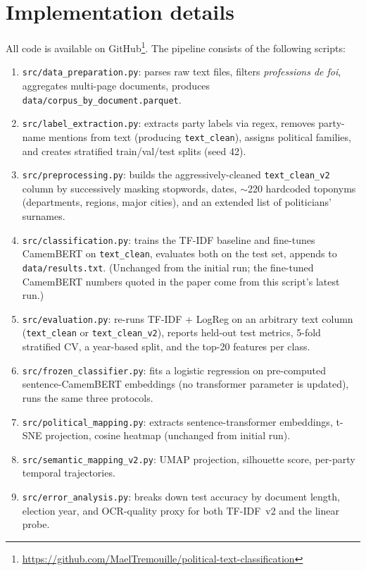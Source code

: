\documentclass{article}
\begin{document}
\appendix

\section{Implementation details}
\label{app:implementation}

All code is available on GitHub\footnote{\url{https://github.com/MaelTremouille/political-text-classification}}. The pipeline consists of the following scripts:

\begin{enumerate}
    \item \texttt{src/data\_preparation.py}: parses raw text files, filters \textit{professions de foi}, aggregates multi-page documents, produces \texttt{data/corpus\_by\_document.parquet}.
    \item \texttt{src/label\_extraction.py}: extracts party labels via regex, removes party-name mentions from text (producing \texttt{text\_clean}), assigns political families, and creates stratified train/val/test splits (seed 42).
    \item \texttt{src/preprocessing.py}: builds the aggressively-cleaned \texttt{text\_clean\_v2} column by successively masking stopwords, dates, $\sim$220 hardcoded toponyms (departments, regions, major cities), and an extended list of politicians' surnames.
    \item \texttt{src/classification.py}: trains the TF-IDF baseline and fine-tunes CamemBERT on \texttt{text\_clean}, evaluates both on the test set, appends to \texttt{data/results.txt}. (Unchanged from the initial run; the fine-tuned CamemBERT numbers quoted in the paper come from this script's latest run.)
    \item \texttt{src/evaluation.py}: re-runs TF-IDF + LogReg on an arbitrary text column (\texttt{text\_clean} or \texttt{text\_clean\_v2}), reports held-out test metrics, 5-fold stratified CV, a year-based split, and the top-20 features per class.
    \item \texttt{src/frozen\_classifier.py}: fits a logistic regression on pre-computed sentence-CamemBERT embeddings (no transformer parameter is updated), runs the same three protocols.
    \item \texttt{src/political\_mapping.py}: extracts sentence-transformer embeddings, t-SNE projection, cosine heatmap (unchanged from initial run).
    \item \texttt{src/semantic\_mapping\_v2.py}: UMAP projection, silhouette score, per-party temporal trajectories.
    \item \texttt{src/error\_analysis.py}: breaks down test accuracy by document length, election year, and OCR-quality proxy for both TF-IDF~v2 and the linear probe.
\end{enumerate}
\end{document}
